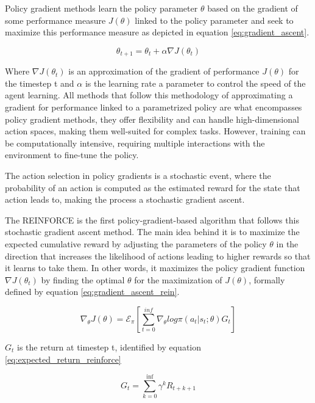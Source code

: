 Policy gradient methods learn the policy parameter $\theta$ based on the gradient of some performance measure $J(\theta)$ linked to the policy parameter and seek to maximize this performance measure as depicted in equation \ref{eq:gradient_ascent}.

\begin{equation}
    \label{eq:gradient_ascent}
    \theta_{t+1} = \theta_t + \alpha \nabla J (\theta_t)
\end{equation}

Where $\nabla J (\theta_t)$ is an approximation of the gradient of performance $J(\theta)$ for the timestep t and $\alpha$ is the learning rate a parameter to control the speed of the agent learning. All methods that follow this methodology of approximating a gradient for performance linked to a parametrized policy are what encompasses policy gradient methods, they offer flexibility and can handle high-dimensional action spaces, making them well-suited for complex tasks. However, training can be computationally intensive, requiring multiple interactions with the environment to fine-tune the policy.

The action selection in policy gradients is a stochastic event, where the probability of an action is computed as the estimated reward for the state that action leads to, making the process a stochastic gradient ascent.

The REINFORCE \cite{sutton1999policy} is the first policy-gradient-based algorithm that follows this stochastic gradient ascent method. The main idea behind it is to maximize the expected cumulative reward by adjusting the parameters of the policy $\theta$ in the direction that increases the likelihood of actions leading to higher rewards so that it learns to take them. In other words, it maximizes the policy gradient function $\nabla J (\theta_t)$ by finding the optimal $\theta$ for the maximization of $J(\theta)$, formally defined by equation \ref{eq:gradient_ascent_rein}.

\begin{equation}
    \label{eq:gradient_ascent_rein}
    \nabla_\theta J(\theta) = \mathcal{E}_\pi[\sum_{t=0}^{inf}\nabla_\theta log \pi(a_t|s_t;\theta)G_t]
\end{equation}

$G_t$ is the return at timestep t, identified by equation \ref{eq:expected_return_reinforce}

\begin{equation}
    \label{eq:expected_return_reinforce}
    G_t = \sum_{k=0}^{\inf} \gamma^k R_{t+k+1}
\end{equation}

